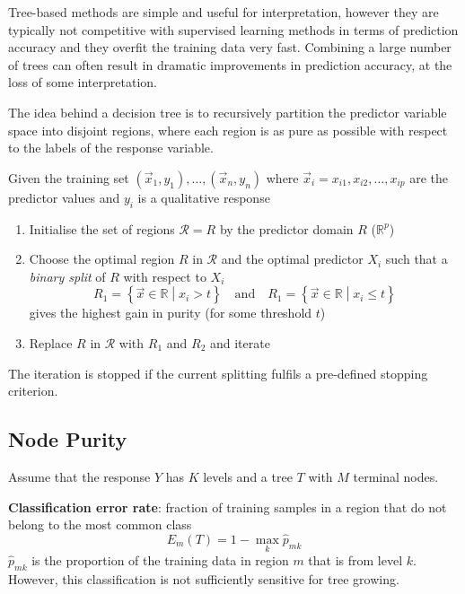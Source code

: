 \documentclass[11pt]{article}
\newcommand*\R{\mathbb{R}}
\begin{document}
Tree-based methods are simple and useful for interpretation, however they are typically not competitive with supervised learning methods in terms of prediction accuracy and they overfit the training data very fast. Combining a large number of trees can often result in dramatic improvements in prediction accuracy, at the loss of some interpretation.

The idea behind a decision tree is to recursively partition the predictor variable space into disjoint regions, where each region is as pure as possible with respect to the labels of the response variable.

\begin{definition}
	Given the training set $(\vec{x}_1,y_1),\dots,(\vec{x}_n,y_n)$ where $\vec{x}_i = x_{i1}, x_{i2}, \dots, x_{ip}$ are the predictor values and $y_i$ is a qualitative response
	\begin{enumerate}
		\item Initialise the set of regions $\mathcal{R} = {R}$ by the predictor domain $R$ ($\R^p$)
		\item Choose the optimal region $R$ in $\mathcal{R}$ and the optimal predictor $X_i$ such that a \emph{binary split} of $R$ with respect to $X_i$
		\begin{equation*}
			R_1 = \left\{ \vec{x} \in \R \middle| x_i > t \right\} \quad\text{and}\quad R_1 = \left\{ \vec{x} \in \R \middle| x_i \leq t \right\}
		\end{equation*}
		gives the highest gain in purity (for some threshold $t$)
		\item Replace $R$ in $\mathcal{R}$ with $R_1$ and $R_2$ and iterate
	\end{enumerate}
	The iteration is stopped if the current splitting fulfils a pre-defined stopping criterion.
\end{definition}

\subsection{Node Purity}
Assume that the response $Y$ has $K$ levels and a tree $T$ with $M$ terminal nodes.

\vspace{1em}
\noindent
\textbf{Classification error rate}: fraction of training samples in a region that do not belong to the most common class
\begin{equation*}
	E_m(T) = 1 - \max_k \hat{p}_{mk}
\end{equation*}
$\hat{p}_{mk}$ is the proportion of the training data in region $m$ that is from level $k$. However, this classification is not sufficiently sensitive for tree growing.
\end{document}
